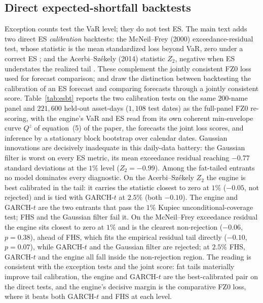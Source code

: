 \documentclass[11pt]{article}
\begin{document}
\subsection*{Direct expected-shortfall backtests}\label{sec:esbt-oa}
Exception counts test the VaR level; they do not test ES. The main text adds two
direct ES \emph{calibration} backtests: the McNeil--Frey (2000)
exceedance-residual test, whose statistic is the mean standardized loss beyond
VaR, zero under a correct ES \citep{mcneilfrey2000}; and the Acerbi--Sz\'ekely
(2014) statistic $Z_2$, negative when ES understates the realized tail
\citep{acerbi2014backtesting}. These complement the jointly consistent FZ0 loss
used for forecast comparison; \citet{noldeziegel2017elicitability} and
\citet{bayer2022esr} draw the distinction between backtesting the calibration of
an ES forecast and comparing forecasts through a jointly consistent score.
Table~\ref{tab:esbt} reports the two calibration tests on the same $200$-name
panel and $221{,}600$ held-out asset-days ($1{,}108$ test dates) as the
full-panel FZ0 re-scoring, with the engine's VaR and ES read from its own
coherent min-envelope curve $Q^{z}$ of equation~(5) of the paper, the forecasts the joint loss
scores, and inference by a stationary block bootstrap
over calendar dates. Gaussian innovations are decisively inadequate in this
daily-data battery: the Gaussian filter is worst on every ES metric, its mean
exceedance residual reaching $-0.77$ standard deviations at the $1\%$ level
($Z_2=-0.99$). Among the fat-tailed entrants no model dominates every diagnostic.
On the Acerbi--Sz\'ekely $Z_2$ the engine is best calibrated in the tail: it
carries the statistic closest to zero at $1\%$ ($-0.05$, not rejected) and is
tied with GARCH-$t$ at $2.5\%$ (both $-0.10$). The engine
and GARCH-$t$ are the two entrants that pass the $1\%$ Kupiec
unconditional-coverage test; FHS and the Gaussian filter fail it. On the
McNeil--Frey exceedance residual the engine sits closest to zero at $1\%$ and is
the clearest non-rejection ($-0.06$, $p=0.38$), ahead of FHS, which fits the empirical
residual tail directly ($-0.10$, $p=0.07$), while GARCH-$t$ and the Gaussian filter are
rejected; at $2.5\%$ FHS, GARCH-$t$ and the engine all
fall inside the non-rejection region. The reading is consistent with the
exception tests and the joint score: fat tails materially improve tail
calibration, the engine and GARCH-$t$ are the best-calibrated pair on the direct
tests, and the engine's decisive margin is the comparative FZ0 loss, where it
beats both GARCH-$t$ and FHS at each level.
\end{document}
